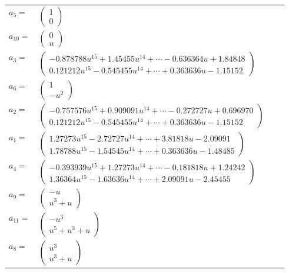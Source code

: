 \documentclass[1p]{elsarticle_modified}
\theoremstyle{definition}
\begin{document}
\begin{tabular}{m{7pt} m{180pt} m{7pt} m{180pt} }
\flushright $a_{5}=$&$\begin{pmatrix}1\\0\end{pmatrix}$ \\
\flushright $a_{10}=$&$\begin{pmatrix}0\\u\end{pmatrix}$ \\
\flushright $a_{3}=$&$\begin{pmatrix}-0.878788 u^{15}+1.45455 u^{14}+\cdots-0.636364 u+1.84848\\0.121212 u^{15}-0.545455 u^{14}+\cdots+0.363636 u-1.15152\end{pmatrix}$ \\
\flushright $a_{6}=$&$\begin{pmatrix}1\\- u^2\end{pmatrix}$ \\
\flushright $a_{2}=$&$\begin{pmatrix}-0.757576 u^{15}+0.909091 u^{14}+\cdots-0.272727 u+0.696970\\0.121212 u^{15}-0.545455 u^{14}+\cdots+0.363636 u-1.15152\end{pmatrix}$ \\
\flushright $a_{1}=$&$\begin{pmatrix}1.27273 u^{15}-2.72727 u^{14}+\cdots+3.81818 u-2.09091\\1.78788 u^{15}-1.54545 u^{14}+\cdots+0.363636 u-1.48485\end{pmatrix}$ \\
\flushright $a_{4}=$&$\begin{pmatrix}-0.393939 u^{15}+1.27273 u^{14}+\cdots-0.181818 u+1.24242\\1.36364 u^{15}-1.63636 u^{14}+\cdots+2.09091 u-2.45455\end{pmatrix}$ \\
\flushright $a_{9}=$&$\begin{pmatrix}- u\\u^3+u\end{pmatrix}$ \\
\flushright $a_{11}=$&$\begin{pmatrix}- u^3\\u^5+u^3+u\end{pmatrix}$ \\
\flushright $a_{8}=$&$\begin{pmatrix}u^3\\u^3+u\end{pmatrix}$ \\

\end{tabular}
\end{document}
